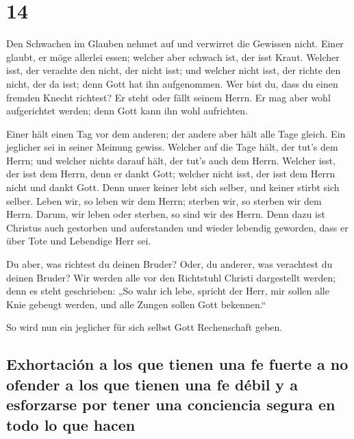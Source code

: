 \hypertarget{section-13}{%
\section{14}\label{section-13}}

 Den Schwachen im Glauben nehmet auf und verwirret die
Gewissen nicht.  Einer glaubt, er möge allerlei essen;
welcher aber schwach ist, der isst Kraut.  Welcher isst,
der verachte den nicht, der nicht isst; und welcher nicht isst, der
richte den nicht, der da isst; denn Gott hat ihn aufgenommen.
 Wer bist du, dass du einen fremden Knecht richtest? Er
steht oder fällt seinem Herrn. Er mag aber wohl aufgerichtet werden;
denn Gott kann ihn wohl aufrichten.

 Einer hält einen Tag vor dem anderen; der andere aber
hält alle Tage gleich. Ein jeglicher sei in seiner Meinung gewiss.
 Welcher auf die Tage hält, der tut's dem Herrn; und
welcher nichts darauf hält, der tut's auch dem Herrn. Welcher isst, der
isst dem Herrn, denn er dankt Gott; welcher nicht isst, der isst dem
Herrn nicht und dankt Gott.  Denn unser keiner lebt sich
selber, und keiner stirbt sich selber.  Leben wir, so
leben wir dem Herrn; sterben wir, so sterben wir dem Herrn. Darum, wir
leben oder sterben, so sind wir des Herrn.  Denn dazu ist
Christus auch gestorben und auferstanden und wieder lebendig geworden,
dass er über Tote und Lebendige Herr sei.

 Du aber, was richtest du deinen Bruder? Oder, du
anderer, was verachtest du deinen Bruder? Wir werden alle vor den
Richtstuhl Christi dargestellt werden;  denn es steht
geschrieben: „So wahr ich lebe, spricht der Herr, mir sollen alle Knie
gebeugt werden, und alle Zungen sollen Gott bekennen.``

 So wird nun ein jeglicher für sich selbst Gott
Rechenschaft geben.

\hypertarget{exhortaciuxf3n-a-los-que-tienen-una-fe-fuerte-a-no-ofender-a-los-que-tienen-una-fe-duxe9bil-y-a-esforzarse-por-tener-una-conciencia-segura-en-todo-lo-que-hacen}{%
\subsection{Exhortación a los que tienen una fe fuerte a no ofender a
los que tienen una fe débil y a esforzarse por tener una conciencia
segura en todo lo que
hacen}\label{exhortaciuxf3n-a-los-que-tienen-una-fe-fuerte-a-no-ofender-a-los-que-tienen-una-fe-duxe9bil-y-a-esforzarse-por-tener-una-conciencia-segura-en-todo-lo-que-hacen}}

